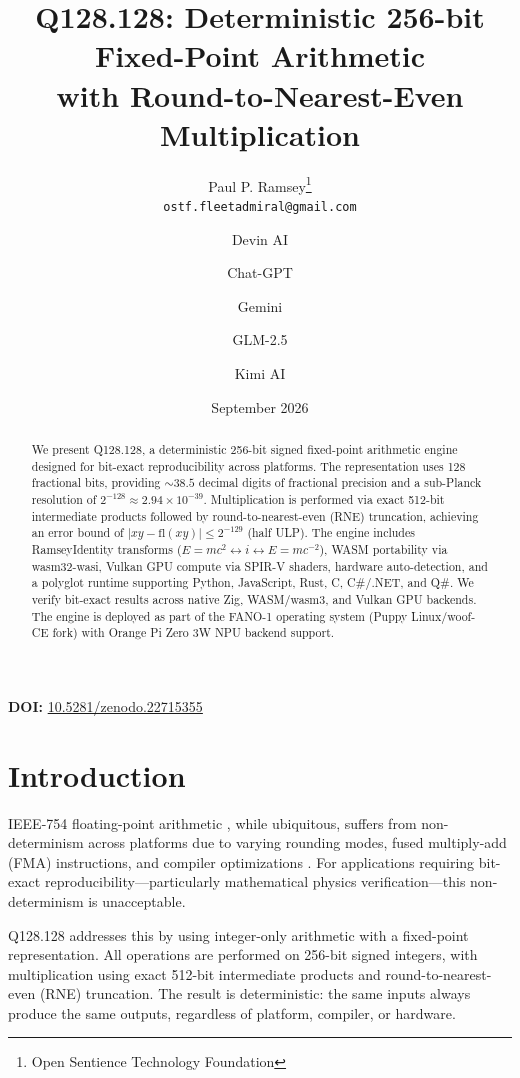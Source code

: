 \documentclass[11pt]{article}
\title{Q128.128: Deterministic 256-bit Fixed-Point Arithmetic \\
with Round-to-Nearest-Even Multiplication}
\author{
Paul P. Ramsey\thanks{Open Sentience Technology Foundation} \\
\texttt{ostf.fleetadmiral@gmail.com}
\and
Devin AI \and Chat-GPT \and Gemini \and GLM-2.5 \and Kimi AI
}
\date{September 2026}
\begin{document}
\maketitle

\noindent\textbf{DOI:} \href{https://doi.org/10.5281/zenodo.22715355}{10.5281/zenodo.22715355}

\begin{abstract}
We present Q128.128, a deterministic 256-bit signed fixed-point arithmetic engine designed for bit-exact reproducibility across platforms. The representation uses 128 fractional bits, providing $\sim 38.5$ decimal digits of fractional precision and a sub-Planck resolution of $2^{-128} \approx 2.94 \times 10^{-39}$. Multiplication is performed via exact 512-bit intermediate products followed by round-to-nearest-even (RNE) truncation, achieving an error bound of $|xy - \mathrm{fl}(xy)| \leq 2^{-129}$ (half ULP). The engine includes RamseyIdentity transforms ($E = mc^2 \leftrightarrow i \leftrightarrow E = mc^{-2}$), WASM portability via wasm32-wasi, Vulkan GPU compute via SPIR-V shaders, hardware auto-detection, and a polyglot runtime supporting Python, JavaScript, Rust, C, C\#/.NET, and Q\#. We verify bit-exact results across native Zig, WASM/wasm3, and Vulkan GPU backends. The engine is deployed as part of the FANO-1 operating system (Puppy Linux/woof-CE fork) with Orange Pi Zero 3W NPU backend support.
\end{abstract}

\tableofcontents
\newpage

\section{Introduction}

IEEE-754 floating-point arithmetic \cite{ieee754_2019}, while ubiquitous, suffers from non-determinism across platforms due to varying rounding modes, fused multiply-add (FMA) instructions, and compiler optimizations \cite{goldberg_1991, monniaux_2008}. For applications requiring bit-exact reproducibility---particularly mathematical physics verification---this non-determinism is unacceptable.

Q128.128 addresses this by using integer-only arithmetic with a fixed-point representation. All operations are performed on 256-bit signed integers, with multiplication using exact 512-bit intermediate products and round-to-nearest-even (RNE) truncation. The result is deterministic: the same inputs always produce the same outputs, regardless of platform, compiler, or hardware.
\end{document}

